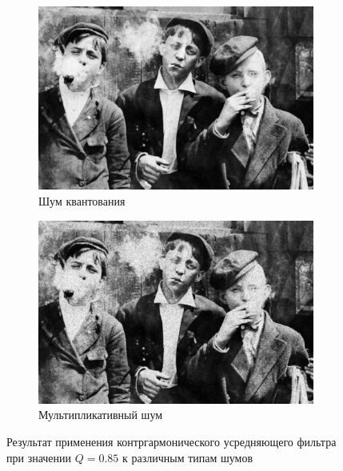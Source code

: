 \begin{figure}[ht]
\begin{subfigure}[b]{0.5\linewidth}
      \includegraphics[width=0.95\linewidth]{../Contraharmonic_Filter/Contraharmonic_Poisson_noise_(m,n=(3,_3),q=0.85).jpg} 
      \caption{Шум квантования} 
      \label{contraharmonic_0.85:e}
    \end{subfigure}%
    \begin{subfigure}[b]{0.5\linewidth}
        \centering
        \includegraphics[width=0.95\linewidth]{../Contraharmonic_Filter/Contraharmonic_Speckle_noise_(m,n=(3,_3),q=0.85).jpg} 
        \caption{Мультипликативный шум} 
        \label{contraharmonic_0.85:f} 
    \end{subfigure} 
    \caption{Результат применения контргармонического усредняющего фильтра при значении $Q = 0.85$ к различным типам шумов}
    \label{img:contraharmonic_0.85} 
  \end{figure}

